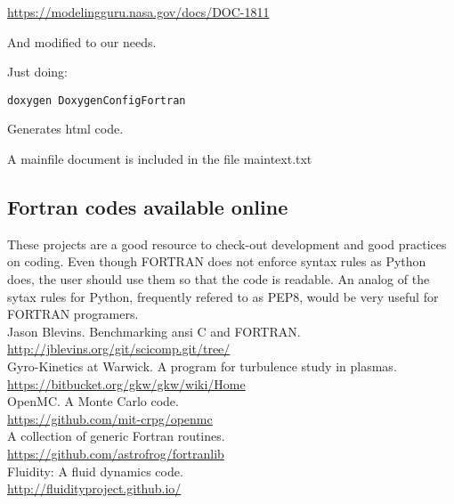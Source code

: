 \documentclass[10pt, oneside, pdftex]{article}
\begin{document}
\url{https://modelingguru.nasa.gov/docs/DOC-1811}

And modified to our needs.

Just doing:

\begin{lstlisting}
doxygen DoxygenConfigFortran
\end{lstlisting}

Generates html code.

A mainfile document is included in the file maintext.txt


\subsection{Fortran codes available online}
These projects are  a good resource to check-out  development and good
practices on coding. Even though FORTRAN does not enforce syntax rules
as  Python  does,  the user  should  use  them  so  that the  code  is
readable. An analog of the  sytax rules for Python, frequently refered
to as PEP8, would be very useful for FORTRAN programers. \\

Jason Blevins. Benchmarking ansi C and FORTRAN.\\
\url{http://jblevins.org/git/scicomp.git/tree/}\\

Gyro-Kinetics at Warwick. A program for turbulence study in plasmas.\\
\url{https://bitbucket.org/gkw/gkw/wiki/Home}\\

OpenMC. A Monte Carlo code.\\
\url{https://github.com/mit-crpg/openmc}\\

A collection of generic Fortran routines.\\
\url{https://github.com/astrofrog/fortranlib}\\

Fluidity: A fluid dynamics code.\\
\url{http://fluidityproject.github.io/}\\



\end{document}
